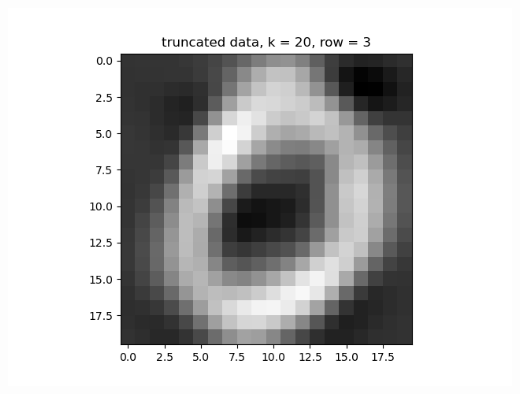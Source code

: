 \documentclass{article}
\begin{document}
\begin{enumerate}
\begin{enumerate}
\begin{center}
			\includegraphics[scale=.4]{hw3 trunc, k = 20, row = 3}
			

\end{center}
\end{enumerate}
\end{enumerate}
\end{document}
